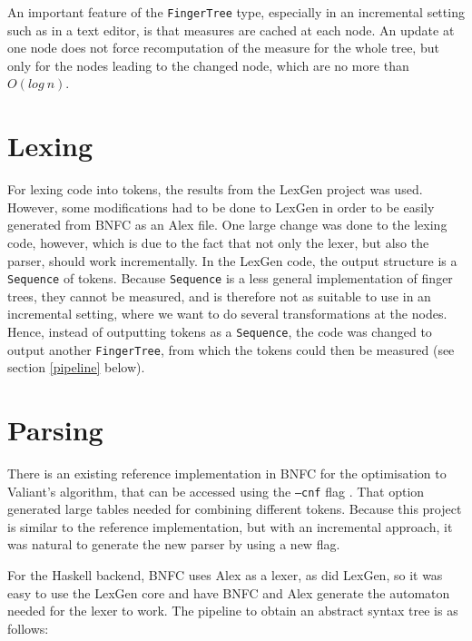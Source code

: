 \documentclass[a4paper,12pt,twosided]{report}
\renewcommand\cite{\citep}
\begin{document}
An important feature of the \texttt{FingerTree} type, especially in an incremental
setting such as in a text editor, is that measures are cached at each node. An
update at one node does not force recomputation of the measure for the whole
tree, but only for the nodes leading to the changed node, which are no more than
$O(log\ n)$. 

\section{Lexing}
For lexing code into tokens, the results from the LexGen project was used.
However, some modifications had to be done to LexGen in order to be easily
generated from BNFC as an Alex file. One large change was done to the lexing
code, however, which is due to the fact that not only the lexer, but also the
parser, should work incrementally. In the LexGen code, the output structure is a
\texttt{Sequence} of tokens. Because \texttt{Sequence} is a less general
implementation of finger trees, they cannot be measured, and is therefore not as
suitable to use in an incremental setting, where we want to do several
transformations at the nodes. Hence, instead of outputting tokens
as a \texttt{Sequence}, the code was changed to output another
\texttt{FingerTree}, from which the tokens could then be measured (see section
\ref{pipeline} below).

\section{Parsing}
There is an existing reference implementation in BNFC for the optimisation to
Valiant's algorithm, that can be accessed using the \texttt{--cnf} flag
\cite{parparsepaper}.  That option generated large tables needed for combining
different tokens. Because this project is similar to the reference
implementation, but with an incremental approach, it was natural to generate the
new parser by using a new flag.

For the Haskell backend, BNFC uses Alex as a lexer, as did LexGen, so it was
easy to use the LexGen core and have BNFC and Alex generate the automaton needed for
the lexer to work. The pipeline to obtain an abstract syntax tree is as follows:
\end{document}
